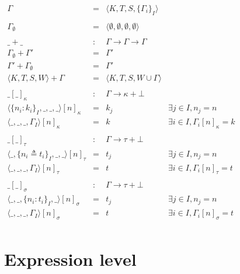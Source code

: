 \documentclass{article}[11pt]
\begin{document}
    \begin{math}
        \begin{array}{rcll}
            \Gamma & = & \langle K, T, S, \{ \Gamma_i \}_I \rangle \\
            \\
            \Gamma_\emptyset & = & \langle \emptyset, \emptyset, \emptyset, \emptyset \rangle \\
            \\
            \_+\_         & : & \Gamma \rightarrow \Gamma \rightarrow \Gamma \\
            \Gamma_\emptyset + \Gamma' & = & \Gamma'    \\
            \Gamma' + \Gamma_\emptyset & = & \Gamma' \\
            \langle K, T, S, W \rangle + \Gamma & =& \langle K, T, S, W \cup \Gamma \rangle \\
            \\
            \_[\_]_\kappa & : & \Gamma \rightarrow \kappa + \bot \\
            \langle \{n_i:k_i\}_I, \_, \_, \_\rangle[n]_\kappa & = & k_j & \exists j \in I, n_j = n \\
            \langle \_, \_, \_, \Gamma_I\rangle[n]_\kappa & = & k & \exists i \in I, \Gamma_i[n]_\kappa = k \\
            \\
            \_[\_]_\tau & : & \Gamma \rightarrow \tau + \bot \\
            \langle \_, \{n_i \triangleq t_i\}_I, \_, \_\rangle[n]_\tau & = & t_j & \exists j \in I, n_j = n \\
            \langle \_, \_, \_, \Gamma_I\rangle[n]_\tau & = & t & \exists i \in I, \Gamma_i[n]_\tau = t \\
            \\
            \_[\_]_\sigma & : & \Gamma \rightarrow \tau + \bot \\
            \langle \_, \_, \{n_i:t_i\}_I, \_\rangle[n]_\sigma & = & t_j & \exists j \in I, n_j = n \\
            \langle \_, \_, \_, \Gamma_I\rangle[n]_\sigma & = & t & \exists i \in I, \Gamma_i[n]_\sigma = t \\
        \end{array}
    \end{math}


    \section{Expression level}\label{sec:expression-level}
\end{document}

